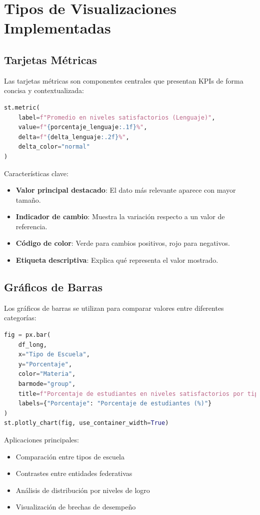 \section{Tipos de Visualizaciones Implementadas}

\subsection{Tarjetas Métricas}
Las tarjetas métricas son componentes centrales que presentan KPIs de forma concisa y contextualizada:

\begin{lstlisting}[language=Python, caption=Implementación de tarjetas métricas]
st.metric(
    label=f"Promedio en niveles satisfactorios (Lenguaje)",
    value=f"{porcentaje_lenguaje:.1f}%",
    delta=f"{delta_lenguaje:.2f}%",
    delta_color="normal"
)
\end{lstlisting}

Características clave:
\begin{itemize}
    \item \textbf{Valor principal destacado}: El dato más relevante aparece con mayor tamaño.
    \item \textbf{Indicador de cambio}: Muestra la variación respecto a un valor de referencia.
    \item \textbf{Código de color}: Verde para cambios positivos, rojo para negativos.
    \item \textbf{Etiqueta descriptiva}: Explica qué representa el valor mostrado.
\end{itemize}

\subsection{Gráficos de Barras}
Los gráficos de barras se utilizan para comparar valores entre diferentes categorías:

\begin{lstlisting}[language=Python, caption=Implementación de gráfico de barras]
fig = px.bar(
    df_long,
    x="Tipo de Escuela",
    y="Porcentaje",
    color="Materia",
    barmode="group",
    title=f"Porcentaje de estudiantes en niveles satisfactorios por tipo de escuela ({anio_seleccionado})",
    labels={"Porcentaje": "Porcentaje de estudiantes (%)"}
)
st.plotly_chart(fig, use_container_width=True)
\end{lstlisting}

Aplicaciones principales:
\begin{itemize}
    \item Comparación entre tipos de escuela
    \item Contrastes entre entidades federativas
    \item Análisis de distribución por niveles de logro
    \item Visualización de brechas de desempeño
\end{itemize}

